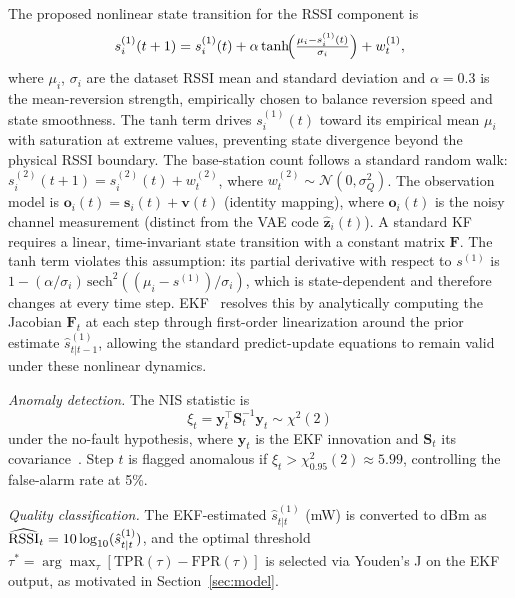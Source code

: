 \documentclass[conference]{IEEEtran}
\begin{document}
The proposed nonlinear state transition for the RSSI component is
\begin{equation}
s^{(1)}_i(t+1) = s^{(1)}_i(t)
  + \alpha\tanh\!\Bigl(\tfrac{\mu_i - s^{(1)}_i(t)}{\sigma_i}\Bigr)
  + w^{(1)}_t,
\label{eq:ss1}
\end{equation}
where $\mu_i$, $\sigma_i$ are the dataset RSSI mean and standard deviation
and $\alpha{=}0.3$ is the mean-reversion strength, empirically chosen to balance reversion speed and state smoothness. The tanh term drives $s^{(1)}_i(t)$ toward its empirical mean $\mu_i$ with saturation at extreme values, preventing state divergence beyond the physical RSSI boundary. The base-station count follows a standard random walk: $s^{(2)}_i(t+1) = s^{(2)}_i(t) + w^{(2)}_t$, where $w^{(2)}_t \sim \mathcal{N}(0, \sigma_Q^2)$. The observation model is
$\mathbf{o}_i(t)=\mathbf{s}_i(t)+\mathbf{v}(t)$ (identity mapping),
where $\mathbf{o}_i(t)$ is the noisy channel measurement (distinct from
the VAE code $\hat{\mathbf{z}}_i(t)$). A standard KF requires a linear, time-invariant state transition with a constant matrix $\mathbf{F}$. The tanh term violates this assumption: its partial derivative with respect to $s^{(1)}$ is $1 - (\alpha/\sigma_i)\,\mathrm{sech}^2((\mu_i - s^{(1)})/\sigma_i)$, which is state-dependent and therefore changes at every time step. EKF~\cite{ref_ekf} resolves this by analytically computing the Jacobian $\mathbf{F}_t$ at each step through first-order linearization around the prior estimate $\hat{s}^{(1)}_{t|t-1}$, allowing the standard predict-update equations to remain valid under these nonlinear dynamics.

\textit{Anomaly detection.}
The NIS statistic is
\begin{equation}
\xi_t = \mathbf{y}_t^\top \mathbf{S}_t^{-1} \mathbf{y}_t \sim \chi^2(2)
\label{eq:nis}
\end{equation}
under the no-fault hypothesis, where $\mathbf{y}_t$ is the EKF innovation
and $\mathbf{S}_t$ its covariance~\cite{ref_ekf}. Step $t$ is flagged
anomalous if $\xi_t > \chi^2_{0.95}(2) \approx 5.99$, controlling the
false-alarm rate at 5\%.

\textit{Quality classification.}
The EKF-estimated $\hat{s}^{(1)}_{t|t}$ (mW) is converted to dBm as
$\widehat{\rm RSSI}_{t}=10\log_{10}(\hat{s}^{(1)}_{t|t})$, and the optimal
threshold $\tau^*=\arg\max_\tau[\mathrm{TPR}(\tau)-\mathrm{FPR}(\tau)]$
is selected via Youden's J on the EKF output, as motivated in
Section~\ref{sec:model}.

\vspace{-6pt}
\end{document}
